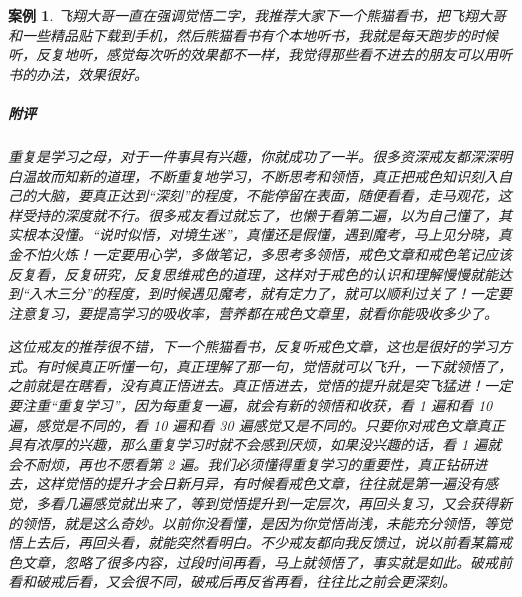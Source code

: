 \documentclass{ctexart}
\newtheorem{case}{案例}
\begin{document}
\begin{case}
    飞翔大哥一直在强调觉悟二字，我推荐大家下一个熊猫看书，把飞翔大哥和一些精品贴下载到手机，然后熊猫看书有个本地听书，我就是每天跑步的时候听，反复地听，感觉每次听的效果都不一样，我觉得那些看不进去的朋友可以用听书的办法，效果很好。
    \subparagraph{附评} 重复是学习之母，对于一件事具有兴趣，你就成功了一半。很多资深戒友都深深明白温故而知新的道理，不断重复地学习，不断思考和领悟，真正把戒色知识刻入自己的大脑，要真正达到“深刻”的程度，不能停留在表面，随便看看，走马观花，这样受持的深度就不行。很多戒友看过就忘了，也懒于看第二遍，以为自己懂了，其实根本没懂。“说时似悟，对境生迷”，真懂还是假懂，遇到魔考，马上见分晓，真金不怕火炼！一定要用心学，多做笔记，多思考多领悟，戒色文章和戒色笔记应该反复看，反复研究，反复思维戒色的道理，这样对于戒色的认识和理解慢慢就能达到“入木三分”的程度，到时候遇见魔考，就有定力了，就可以顺利过关了！一定要注意复习，要提高学习的吸收率，营养都在戒色文章里，就看你能吸收多少了。

    这位戒友的推荐很不错，下一个熊猫看书，反复听戒色文章，这也是很好的学习方式。有时候真正听懂一句，真正理解了那一句，觉悟就可以飞升，一下就领悟了，之前就是在瞎看，没有真正悟进去。真正悟进去，觉悟的提升就是突飞猛进！一定要注重“重复学习”，因为每重复一遍，就会有新的领悟和收获，看 1 遍和看 10 遍，感觉是不同的，看 10 遍和看 30 遍感觉又是不同的。只要你对戒色文章真正具有浓厚的兴趣，那么重复学习时就不会感到厌烦，如果没兴趣的话，看 1 遍就会不耐烦，再也不愿看第 2 遍。我们必须懂得重复学习的重要性，真正钻研进去，这样觉悟的提升才会日新月异，有时候看戒色文章，往往就是第一遍没有感觉，多看几遍感觉就出来了，等到觉悟提升到一定层次，再回头复习，又会获得新的领悟，就是这么奇妙。以前你没看懂，是因为你觉悟尚浅，未能充分领悟，等觉悟上去后，再回头看，就能突然看明白。不少戒友都向我反馈过，说以前看某篇戒色文章，忽略了很多内容，过段时间再看，马上就领悟了，事实就是如此。破戒前看和破戒后看，又会很不同，破戒后再反省再看，往往比之前会更深刻。
\end{case}
\end{document}
